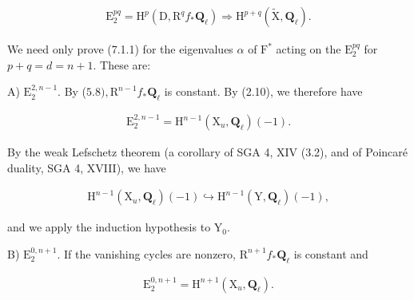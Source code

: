 \documentclass[10pt,leqno]{article}
\begin{document}
\begin{equation*}\begin{gathered}\mathrm{E}_{2}^{pq}=\mathrm{H}^{p}(\mathrm{D},\mathrm{R}^{q} f_{*}\mathbf{Q}_{\ell }) \Rightarrow  \mathrm{H}^{p+q}(\widetilde{\mathrm{X}},\mathbf{Q}_{\ell }).\end{gathered}\end{equation*}

\noindent We need only prove (7.1.1) for the eigenvalues \(\alpha \) of \(\mathrm{F}^{*}\) acting on the \(\mathrm{E}_{2}^{pq}\) for \(p+q=d=n+1\). These are:\par

\noindent A) \(\mathrm{E}_{2}^{2,n- 1}\). By (\(5.8), \mathrm{R}^{n- 1}f_{*}\mathbf{Q}_{\ell }\) is constant. By (2.10), we therefore have\par

\begin{equation*}\begin{gathered}\mathrm{E}_{2}^{2,n- 1}=\mathrm{H}^{n- 1}(\mathrm{X}_{u},\mathbf{Q}_{\ell })(- 1).\end{gathered}\end{equation*}

\noindent By the weak Lefschetz theorem (a corollary of SGA 4, XIV (3.2), and of Poincaré duality, SGA 4, XVIII), we have\par

\begin{equation*}\begin{gathered}\mathrm{H}^{n- 1}(\mathrm{X}_{u},\mathbf{Q}_{\ell })(- 1) \hookrightarrow  \mathrm{H}^{n- 1}(\mathrm{Y},\mathbf{Q}_{\ell })(- 1),\end{gathered}\end{equation*}

\noindent and we apply the induction hypothesis to \(\mathrm{Y}_{0}\).\par

\noindent B) \(\mathrm{E}_{2}^{0,n+1}\). If the vanishing cycles are nonzero, \(\mathrm{R}^{n+1}f_{*}\mathbf{Q}_{\ell }\) is constant and\par

\begin{equation*}\begin{gathered}\mathrm{E}_{2}^{0,n+1}=\mathrm{H}^{n+1}(\mathrm{X}_{u},\mathbf{Q}_{\ell }).\end{gathered}\end{equation*}

\clearpage
\end{document}
